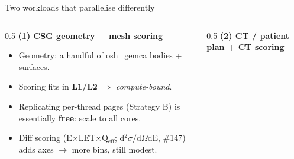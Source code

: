 \documentclass[aspectratio=169,10pt]{beamer}
\newcommand{\code}[1]{{\ttfamily\footnotesize #1}}
\begin{document}
\begin{frame}{Two workloads that parallelise differently}
  \begin{columns}[T]
    \begin{column}{0.5\textwidth}
      \centering\small
      \textcolor{oshGreen}{\textbf{(1) CSG geometry + mesh scoring}}
      \smallskip

      \begin{itemize}\scriptsize\itemsep1pt
        \item Geometry: a handful of \code{osh\_gemca} bodies + surfaces.
        \item Scoring fits in \textbf{L1/L2} $\Rightarrow$ \emph{compute-bound}.
        \item Replicating per-thread pages (Strategy B) is essentially
              \textbf{free}: scale to all cores.
        \item Diff scoring (E$\times$LET$\times$Q$_\text{eff}$; d$^2\sigma/$d$\Omega$dE,
              \#147) adds axes $\to$ more bins, still modest.
      \end{itemize}
      \footnotesize\color{oshGrey}\code{src/gemca/README.md}
    \end{column}
    \begin{column}{0.5\textwidth}
      \centering\small
      \textcolor{oshRed}{\textbf{(2) CT / patient plan + CT scoring}}
      \smallskip


\end{column}
\end{columns}
\end{frame}
\end{document}
